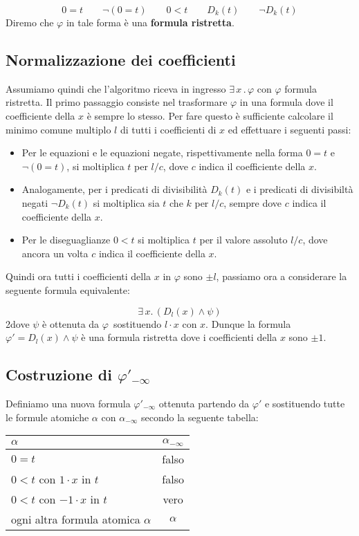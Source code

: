 \documentclass[11pt,letterpaper,twoside]{article}
\begin{document}
$$0=t \qquad \lnot(0=t) \qquad 0<t \qquad D_k(t) \qquad \lnot D_k(t)$$
Diremo che $\varphi$ in tale forma è una \textbf{formula ristretta}.

\subsection{Normalizzazione dei coefficienti} Assumiamo quindi che l'algoritmo
riceva in ingresso $\exists \, x \, . \, \varphi$ con $\varphi$ formula
ristretta. Il primo passaggio consiste nel trasformare $\varphi$ in una formula
dove il coefficiente della $x$ è sempre lo stesso. Per fare questo è sufficiente
calcolare il minimo comune multiplo $l$ di tutti i coefficienti di $x$ ed
effettuare i seguenti passi:

\begin{itemize}
  \item Per le equazioni e le equazioni negate, rispettivamente nella forma
$0=t$ e $\lnot (0=t)$, si moltiplica $t$ per $l/c$, dove $c$ indica il
coefficiente della $x$.
  \item Analogamente, per i predicati di divisibilit\`a $D_k(t)$ e i predicati
di divisibilt\`a negati $\lnot D_k(t)$ si moltiplica sia $t$ che $k$ per $l/c$,
sempre dove $c$ indica il coefficiente della $x$.
  \item Per le diseguaglianze $0<t$ si moltiplica $t$ per il valore assoluto
$l/c$, dove ancora un volta $c$ indica il coefficiente della $x$.
\end{itemize}

Quindi ora tutti i coefficienti della $x$ in $\varphi$ sono $\pm l$, passiamo
ora a considerare la seguente formula equivalente:

$$ \exists \, x . \, (D_l(x) \land \psi)  $$
2dove $\psi$ è ottenuta da $\varphi$\ sostituendo $l \cdot x$ con $x$.  Dunque la
formula $\varphi' = D_l(x) \land \psi$ è una formula ristretta dove i
coefficienti della $x$ sono $\pm 1$.

\subsection{Costruzione di $\varphi'_{- \infty}$} Definiamo una nuova formula
$\varphi'_{- \infty}$ ottenuta partendo da $\varphi'$ e sostituendo tutte le
formule atomiche $\alpha$ con $\alpha_{- \infty}$ secondo la seguente tabella:

\begin{center}
  \begin{tabular}{ l | c }
    $\alpha$ & $\alpha_{- \infty}$ \\ \hline
    $0=t$ & falso \\
    $0 < t$ con $1 \cdot x$ in $t$ & falso \\
    $0 < t$ con $-1 \cdot x$ in $t$ & vero \\
    ogni altra formula atomica $\alpha$ & $\alpha$ \\
  \end{tabular}
\end{center}
\end{document}
